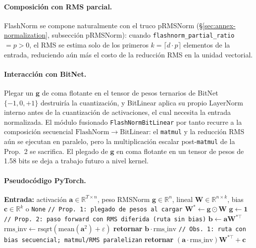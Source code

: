 \paragraph{Composición con RMS parcial.}
FlashNorm se compone naturalmente con el truco pRMSNorm (§\ref{sec:annex-normalization}, subsección pRMSNorm): cuando \texttt{flashnorm\_partial\_ratio} $=p>0$, el RMS se estima solo de los primeros $k=\lceil d\cdot p\rceil$ elementos de la entrada, reduciendo aún más el costo de la reducción RMS en la unidad vectorial.

\paragraph{Interacción con BitNet.}
Plegar un $\mathbf{g}$ de coma flotante en el tensor de pesos ternarios de BitNet $\{-1,0,+1\}$ \citep{wang_bitnet_2023} destruiría la cuantización, y BitLinear aplica su propio LayerNorm interno antes de la cuantización de activaciones, el cual necesita la entrada normalizada. El módulo fusionado \texttt{FlashNormBitLinear} por tanto recurre a la composición secuencial $\mathrm{FlashNorm}\to\mathrm{BitLinear}$: el \texttt{matmul} y la reducción RMS aún se ejecutan en paralelo, pero la multiplicación escalar post-\texttt{matmul} de la Prop.~2 se sacrifica. El plegado de $\mathbf{g}$ en coma flotante en un tensor de pesos de 1.58 bits se deja a trabajo futuro a nivel kernel.

\paragraph{Pseudocódigo PyTorch.}
\begin{algorithmic}[1]
\State \textbf{Entrada:} activación $\mathbf{a}\in\mathbb{R}^{T\times n}$, peso RMSNorm $\mathbf{g}\in\mathbb{R}^{n}$, lineal $\mathbf{W}\in\mathbb{R}^{n\times k}$, bias $\mathbf{c}\in\mathbb{R}^{k}$ o \texttt{None}
\State \texttt{// Prop. 1: plegado de pesos al cargar}
\State $\mathbf{W}^{*}\gets \mathbf{g}\odot\mathbf{W}$ 
\State $\mathbf{g}\gets \mathbf{1}$ 
\State \texttt{// Prop. 2: paso forward con RMS diferida (ruta sin bias)}
\State $\mathbf{b}\gets \mathbf{a}\mathbf{W}^{*\top}$ 
\State $\mathrm{rms\_inv}\gets \mathrm{rsqrt}(\mathrm{mean}(\mathbf{a}^{2})+\varepsilon)$ 
    \State \textbf{retornar} $\mathbf{b}\cdot\mathrm{rms\_inv}$ 
\Else
    \State \texttt{// Obs. 1: ruta con bias secuencial; matmul/RMS paralelizan}
    \State \textbf{retornar} $(\mathbf{a}\cdot\mathrm{rms\_inv})\mathbf{W}^{*\top}+\mathbf{c}$
\EndIf
\end{algorithmic}

